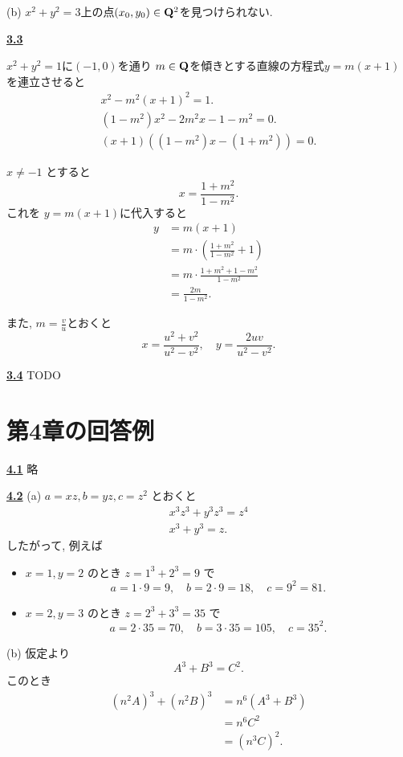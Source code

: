 \documentclass{jarticle}
\newcommand{\cnt}[1]{\noindent \underline{\textbf{#1}}}
\begin{document}
\noindent (b) %
$x^2 + y^2 = 3$上の点$(x_0, y_0) \in \mathbf{Q}^2$を見つけられない.

\cnt{3.3} %

$x^2 + y^2 = 1$に$(-1, 0)$を通り $m \in \mathbf{Q}$を傾きとする直線の方程式$y = m(x+1)$を連立させると
\begin{align*}
x^2 - m^2(x + 1)^2 = 1. \\
(1 - m^2)x^2 - 2m^2x - 1 - m^2 = 0. \\
(x + 1)((1-m^2)x - (1+m^2)) = 0.
\end{align*}

$x \neq -1$ とすると
\[
  x = \frac{1 + m^2}{1 - m^2}.
\]
これを $y = m(x+1)$に代入すると
\begin{align*}
y
  &= m(x+1) \\
  &= m \cdot (\frac{1+m^2}{1-m^2} + 1) \\
  &= m \cdot \frac{1 + m^2 + 1 - m^2}{1 - m^2} \\
  &= \frac{2m}{1 - m^2}.
\end{align*}

また, $m = \frac{v}{u}$とおくと
\[
  x = \frac{u^2 + v^2}{u^2 - v^2}, \quad
  y = \frac{2uv}{u^2 - v^2}.
\]

\cnt{3.4} %
TODO


\section{第4章の回答例} %

\cnt{4.1} %
略

\cnt{4.2} \indent %
\noindent (a) $a = xz, b = yz, c = z^2$ とおくと %
\begin{align*}
  x^3 z^3 + y^3 z^3 = z^4 \\
  x^3 + y^3 = z.
\end{align*}
したがって, 例えば
\begin{itemize}
\item $x = 1, y = 2$ のとき $z = 1^3 + 2^3 = 9$ で
\[
  a = 1 \cdot 9 = 9, \quad
  b = 2 \cdot 9 = 18, \quad
  c = 9^2 = 81.
\]
\item $x = 2, y = 3$ のとき $z = 2^3 + 3^3 = 35$ で
\[
  a = 2 \cdot 35 = 70, \quad
  b = 3 \cdot 35 = 105, \quad
  c = 35^2.
\]
\end{itemize}

\noindent (b) %
仮定より
\[
  A^3 + B^3 = C^2.
\]
このとき
\begin{align*}
(n^2A)^3 + (n^2B)^3
  &= n^6(A^3 + B^3) \\
  &= n^6 C^2 \\
  &= (n^3C)^2.
\end{align*}
\end{document}
